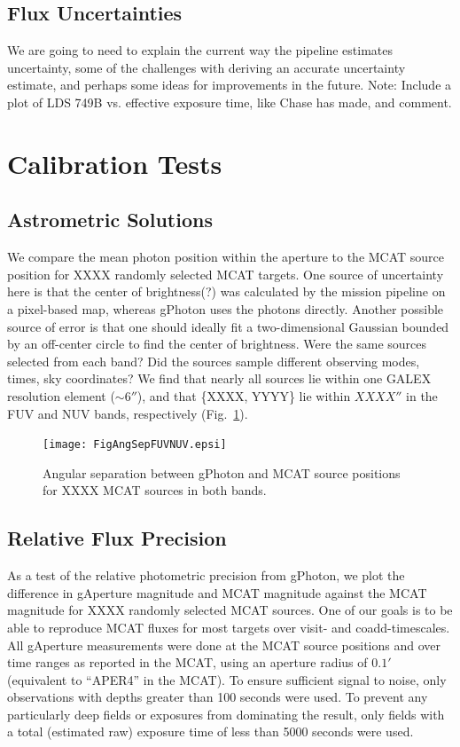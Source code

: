 \documentclass[5p]{elsarticle}
\begin{document}
\subsection{Flux Uncertainties}
{\color{red}We are going to need to explain the current way the pipeline estimates uncertainty, some of the challenges with deriving an accurate uncertainty estimate, and perhaps some ideas for improvements in the future.}
{\color{red}Note: Include a plot of LDS 749B vs. effective exposure time, like Chase has made, and comment.}

\section{Calibration Tests}
\label{calibration}

\subsection{Astrometric Solutions}
We compare the mean photon position within the aperture to the MCAT source position for {\color{red}XXXX} randomly selected MCAT targets. One source of uncertainty here is that the {\color{red}center of brightness(?)} was calculated by the mission pipeline on a pixel-based map, whereas gPhoton uses the photons directly. Another possible source of error is that one should ideally fit a two-dimensional Gaussian bounded by an off-center circle to find the center of brightness.  {\color{red}Were the same sources selected from each band?  Did the sources sample different observing modes, times, sky coordinates?}  We find that nearly all sources lie within one GALEX resolution element ($\sim 6''$), and that \{{\color{red}XXXX, YYYY}\} lie within {\color{red}$XXXX''$} in the FUV and NUV bands, respectively (Fig.\ \ref{fuvnuvastrometry}).

\begin{figure}
\texttt{[image: FigAngSepFUVNUV.epsi]}
\caption{Angular separation between gPhoton and MCAT source positions for {\color{red}XXXX} MCAT sources in both bands. \label{fuvnuvastrometry}}
\end{figure}

\subsection{Relative Flux Precision}
As a test of the relative photometric precision from gPhoton, we plot the difference in gAperture magnitude and MCAT magnitude against the MCAT magnitude for {\color{red}XXXX} randomly selected MCAT sources.  One of our goals is to be able to reproduce MCAT fluxes for most targets over visit- and coadd-timescales.  All gAperture measurements were done at the MCAT source positions and over time ranges as reported in the MCAT, using an aperture radius of $0.1'$ (equivalent to ``APER4'' in the MCAT). To ensure sufficient signal to noise, only observations with depths greater than 100 seconds were used. To prevent any particularly deep fields or exposures from dominating the result, only fields with a total (estimated raw) exposure time of less than 5000 seconds were used.
\end{document}
